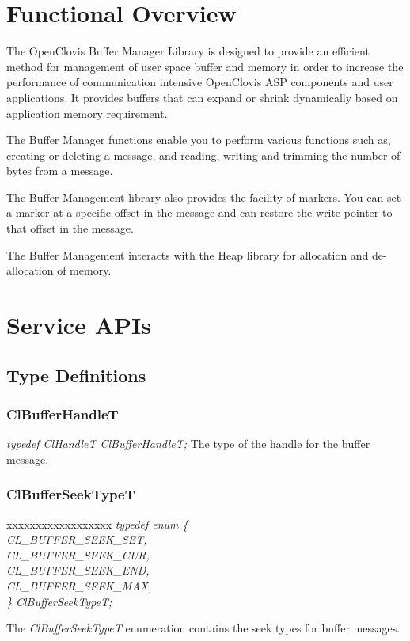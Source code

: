 
\hypertarget{group__group9}{
\chapter{Functional Overview}
\label{group__group9}
}




The OpenClovis Buffer Manager Library is designed to provide an efficient method for management of user space buffer and memory in 
order to increase the performance of communication intensive OpenClovis ASP components and user applications. It provides buffers that can expand 
or shrink dynamically based on application memory requirement. \par
 \par
 The Buffer Manager functions enable you to perform various functions such as, creating or deleting a message, and reading, writing and trimming 
 the number of bytes from a message. \par
 \par
 The Buffer Management library also provides the facility of markers. You can set a marker at a specific offset in the message and can restore 
 the write pointer to that offset in the message.
\par
The Buffer Management interacts with the Heap library for allocation 
and de-allocation of memory.





\chapter{Service APIs}

\section{Type Definitions}
\subsection{ClBufferHandleT}
\textit{typedef ClHandleT ClBufferHandleT;}
\newline
\newline
The type of the handle for the buffer message.



\subsection{ClBufferSeekTypeT}
\begin{tabbing}
xx\=xx\=xx\=xx\=xx\=xx\=xx\=xx\=xx\=\kill
\textit{typedef enum \{}\\
\>\>\>\>\textit{CL\_BUFFER\_SEEK\_SET,}\\
\>\>\>\>\textit{CL\_BUFFER\_SEEK\_CUR,}\\
\>\>\>\>\textit{CL\_BUFFER\_SEEK\_END,}\\
\>\>\>\>\textit{CL\_BUFFER\_SEEK\_MAX,}\\
\textit{\} ClBufferSeekTypeT;}\end{tabbing}
The \textit{ClBufferSeekTypeT} enumeration contains the seek types for buffer messages. 

